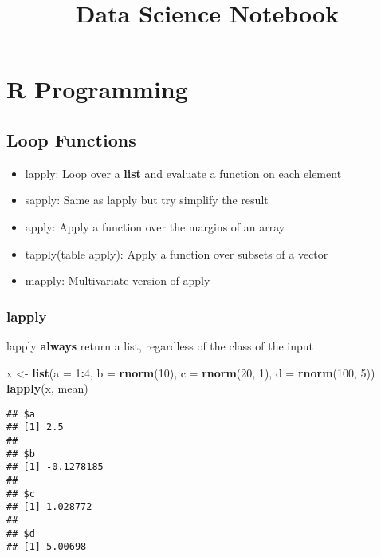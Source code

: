 \documentclass[
]{article}
\title{Data Science Notebook}
\author{}
\date{\vspace{-2.5em}}
\newenvironment{Shaded}{\begin{snugshade}}{\end{snugshade}}
\newcommand{\DataTypeTok}[1]{\textcolor[rgb]{0.13,0.29,0.53}{#1}}
\newcommand{\DecValTok}[1]{\textcolor[rgb]{0.00,0.00,0.81}{#1}}
\newcommand{\KeywordTok}[1]{\textcolor[rgb]{0.13,0.29,0.53}{\textbf{#1}}}
\newcommand{\NormalTok}[1]{#1}
\newcommand{\OperatorTok}[1]{\textcolor[rgb]{0.81,0.36,0.00}{\textbf{#1}}}
\newcommand{\StringTok}[1]{\textcolor[rgb]{0.31,0.60,0.02}{#1}}
\begin{document}
\maketitle

\hypertarget{r-programming}{%
\section{R Programming}\label{r-programming}}

\hypertarget{loop-functions}{%
\subsection{Loop Functions}\label{loop-functions}}

\begin{itemize}
\item
  lapply: Loop over a \textbf{list} and evaluate a function on each
  element
\item
  sapply: Same as lapply but try simplify the result
\item
  apply: Apply a function over the margins of an array
\item
  tapply(table apply): Apply a function over subsets of a vector
\item
  mapply: Multivariate version of apply
\end{itemize}

\hypertarget{lapply}{%
\subsubsection{lapply}\label{lapply}}

lapply \textbf{always} return a list, regardless of the class of the
input

\begin{Shaded}
\begin{Highlighting}[]
\NormalTok{x \textless{}{-}}\StringTok{ }\KeywordTok{list}\NormalTok{(}\DataTypeTok{a =} \DecValTok{1}\OperatorTok{:}\DecValTok{4}\NormalTok{, }\DataTypeTok{b =} \KeywordTok{rnorm}\NormalTok{(}\DecValTok{10}\NormalTok{), }\DataTypeTok{c =} \KeywordTok{rnorm}\NormalTok{(}\DecValTok{20}\NormalTok{, }\DecValTok{1}\NormalTok{), }\DataTypeTok{d =} \KeywordTok{rnorm}\NormalTok{(}\DecValTok{100}\NormalTok{, }\DecValTok{5}\NormalTok{))}
\KeywordTok{lapply}\NormalTok{(x, mean)}
\end{Highlighting}
\end{Shaded}

\begin{verbatim}
## $a
## [1] 2.5
## 
## $b
## [1] -0.1278185
## 
## $c
## [1] 1.028772
## 
## $d
## [1] 5.00698
\end{verbatim}
\end{document}
